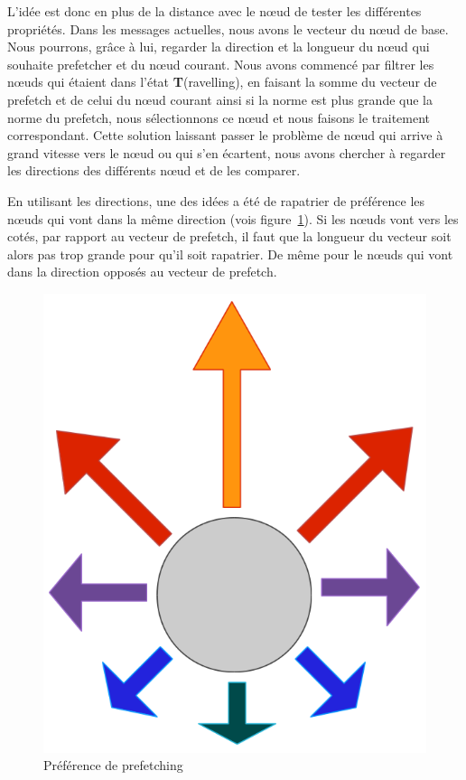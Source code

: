 \par L'idée est donc en plus de la distance avec le nœud de tester les différentes propriétés. Dans les messages actuelles, nous avons le vecteur du nœud de base. Nous pourrons, grâce à lui, regarder la direction et la longueur du nœud qui souhaite prefetcher et du nœud courant. Nous avons commencé par filtrer les nœuds qui étaient dans l'état \textbf{T}(ravelling), en faisant la somme du vecteur de prefetch et de celui du nœud courant ainsi si la norme est plus grande que la norme du prefetch, nous sélectionnons ce nœud et nous faisons le traitement correspondant. Cette solution laissant passer le problème de nœud qui arrive à grand vitesse vers le nœud ou qui s'en écartent, nous avons chercher à regarder les directions des différents nœud et de les comparer.
\par En utilisant les directions, une des idées a été de rapatrier de préférence les nœuds qui vont dans la même direction (vois figure~\ref{PrefetchSol}). Si les nœuds vont vers les cotés, par rapport au vecteur de prefetch, il faut que la longueur du vecteur soit alors pas trop grande pour qu'il soit rapatrier. De même pour le nœuds qui vont dans la direction opposés au vecteur de prefetch.

	\begin{figure}[!h]
        \centering
        \includegraphics[scale=0.30]{./Ressources/Images/prefetchSol.png}
        \caption{Préférence de prefetching}
        \label{PrefetchSol}
        \end{figure}

